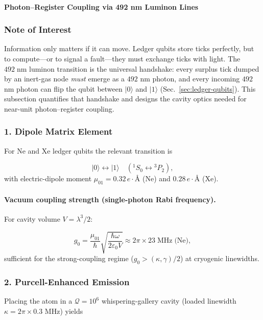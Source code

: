 \documentclass[11pt,oneside]{book}
\begin{document}
\bigskip

\paragraph{Photon–Register Coupling via 492 nm Luminon Lines}
\label{sec:photon-coupling}

\subsubsection*{Note of Interest}

Information only matters if it can move.
Ledger qubits store ticks perfectly, but to compute—or to signal a
fault—they must exchange ticks with light.  
The $492\;\text{nm}$ luminon transition is the universal handshake:
every surplus tick dumped by an inert-gas node \emph{must} emerge as a
$492$ nm photon, and every incoming $492$ nm photon can flip the qubit
between $|0\rangle$ and $|1\rangle$ (Sec.~\ref{sec:ledger-qubits}).
This subsection quantifies that handshake and designs the cavity optics
needed for near-unit photon–register coupling.

\subsubsection*{1. Dipole Matrix Element}

For Ne and Xe ledger qubits the relevant transition is

\[
   |0\rangle \longleftrightarrow |1\rangle
   \quad
   ({}^1S_0 \leftrightarrow {}^3P_2),
\]
with electric-dipole moment
\(\mu_{01} = 0.32\,e\!\cdot\!\text{Å}\) (Ne)  
and \(0.28\,e\!\cdot\!\text{Å}\) (Xe).

\paragraph{Vacuum coupling strength (single-photon Rabi frequency).}
For cavity volume \(V = \lambda^3/2\):

\[
   g_0
   =
   \frac{\mu_{01}}{\hbar}
   \sqrt{\frac{\hbar\omega}{2\varepsilon_0 V}}
   \approx
   2\pi\times 23\;\text{MHz}\;\text{(Ne)},
\]
sufficient for the strong-coupling regime
(\(g_0 > (\kappa,\gamma)/2\)) at cryogenic linewidths.

\subsubsection*{2. Purcell-Enhanced Emission}

Placing the atom in a $\mathcal Q=10^6$ whispering-gallery cavity
(loaded linewidth \(\kappa=2\pi\times0.3\) MHz) yields
\end{document}
